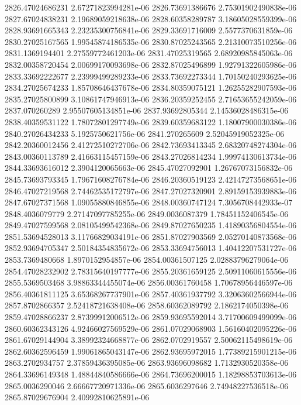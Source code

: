 {2826.47024686231 2.67271823994281e-06
2826.73691386676 2.75301902490838e-06
2827.67024838231 2.19689059218638e-06
2828.60358289787 3.18605028559399e-06
2828.93691665343 2.23235300756841e-06
2829.33691716009 2.5577370631859e-06
2830.27025167565 1.99545874186535e-06
2830.87025243565 2.21310073510256e-06
2831.1369194401 2.27559772461203e-06
2831.47025319565 2.68920985845063e-06
2832.00358720454 2.00699170093698e-06
2832.87025496899 1.92791322605986e-06
2833.33692222677 2.23999499289233e-06
2833.73692273344 1.70150240293625e-06
2834.27025674233 1.85708646437678e-06
2834.80359075121 1.26255282907593e-06
2835.27025800899 3.10861747946913e-06
2836.20359252455 2.71653655242059e-06
2837.070260289 2.95507605134851e-06
2837.93692805344 2.14536028486315e-06
2838.40359531122 1.78072801297749e-06
2839.60359683122 1.18007900030386e-06
2840.27026434233 5.1925750621756e-06
2841.270265609 2.52045919052325e-06
2842.20360012456 2.41272510272706e-06
2842.73693413345 2.68320748274304e-06
2843.00360113789 2.41663115457159e-06
2843.27026814234 1.99974130613734e-06
2844.33693616012 2.3904120065663e-06
2845.47027092901 1.26767073156832e-06
2845.73693793345 1.79671608276784e-06
2846.20360519123 2.42147273568651e-06
2846.47027219568 2.74462535172797e-06
2847.27027320901 2.89159153939883e-06
2847.67027371568 1.09055880846855e-06
2848.00360747124 7.3056708442933e-07
2848.4036079779 2.27147097785255e-06
2849.0036087379 1.78451152406545e-06
2849.47027599568 2.08105499542368e-06
2849.87027650235 1.41890356804554e-06
2851.53694528013 3.11766829034191e-06
2851.87027903569 2.05270140873568e-06
2852.93694705347 2.50184354835672e-06
2853.33694756013 1.40412207531727e-06
2853.7369480668 1.8970152954857e-06
2854.00361507125 2.02883796279064e-06
2854.47028232902 2.78315640197777e-06
2855.20361659125 2.50911060615556e-06
2855.5369503468 3.98863344455074e-06
2856.00361760458 1.70678956446597e-06
2856.40361811125 3.65368267737901e-06
2857.40361937792 3.32063602566944e-06
2857.8702866357 2.52418721638408e-06
2858.60362089792 2.1862174050398e-06
2859.47028866237 2.87399912006512e-06
2859.93695592014 3.71700609499099e-06
2860.60362343126 4.92466027569529e-06
2861.07029068903 1.56160402095226e-06
2861.67029144904 3.38992324668877e-06
2862.0702919557 2.50062115498619e-06
2862.60362596459 1.99061865043147e-06
2862.93695972015 1.77389215901215e-06
2863.2702934757 2.37859436395085e-06
2863.93696098682 1.7132930520358e-06
2864.33696149348 1.48844840586666e-06
2864.73696200015 1.18298853703613e-06
2865.0036290046 2.66667720971336e-06
2865.6036297646 2.74948227536518e-06
2865.87029676904 2.40992810625891e-06
}
